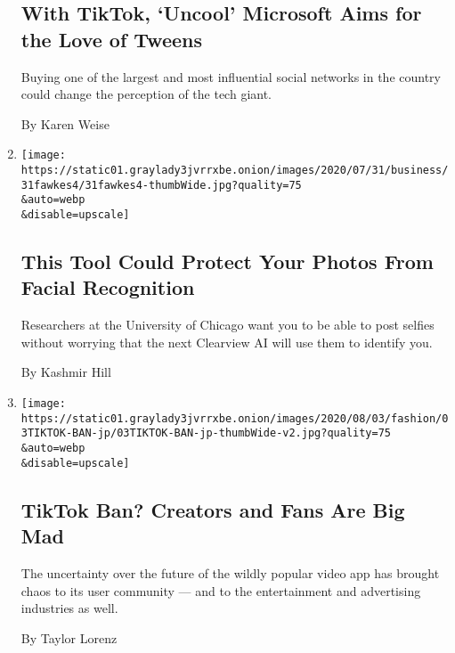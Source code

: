 \begin{enumerate}
  \hypertarget{with-tiktok-uncool-microsoft-aims-for-the-love-of-tweens}{%
  \subsection{With TikTok, `Uncool' Microsoft Aims for the Love of
  Tweens}\label{with-tiktok-uncool-microsoft-aims-for-the-love-of-tweens}}

  Buying one of the largest and most influential social networks in the
  country could change the perception of the tech giant.

  By Karen Weise
\item
  \href{/2020/08/03/technology/fawkes-tool-protects-photos-from-facial-recognition.html}{}

  \texttt{[image: https://static01.graylady3jvrrxbe.onion/images/2020/07/31/business/31fawkes4/31fawkes4-thumbWide.jpg?quality=75\\\&auto=webp\\\&disable=upscale]}

  \hypertarget{this-tool-could-protect-your-photos-from-facial-recognition}{%
  \subsection{This Tool Could Protect Your Photos From Facial
  Recognition}\label{this-tool-could-protect-your-photos-from-facial-recognition}}

  Researchers at the University of Chicago want you to be able to post
  selfies without worrying that the next Clearview AI will use them to
  identify you.

  By Kashmir Hill
\item
  \href{/2020/08/02/style/tiktok-ban-threat-trump.html}{}

  \texttt{[image: https://static01.graylady3jvrrxbe.onion/images/2020/08/03/fashion/03TIKTOK-BAN-jp/03TIKTOK-BAN-jp-thumbWide-v2.jpg?quality=75\\\&auto=webp\\\&disable=upscale]}

  \hypertarget{tiktok-ban-creators-and-fans-are-big-mad}{%
  \subsection{TikTok Ban? Creators and Fans Are Big
  Mad}\label{tiktok-ban-creators-and-fans-are-big-mad}}

  The uncertainty over the future of the wildly popular video app has
  brought chaos to its user community --- and to the entertainment and
  advertising industries as well.

  By Taylor Lorenz
\end{enumerate}

